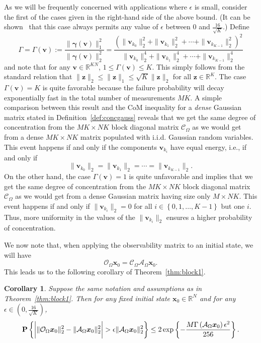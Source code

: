 \documentclass[11pt,draftcls,onecolumn]{IEEEtran}
\def\real    { \mathbb{R} }
\newtheorem{cor}{Corollary}
\newcommand{\eps}{\epsilon}
\newcommand{\norm}[1]{\| #1 \|}
\newcommand{\Prob}[1]{{\bf P}\left\{#1\right\}}
\def \ok {{\mathcal{O}_{\Omega}}}
\def \ck {{\mathcal{C}_{\Omega}}}
\def \ak {{\mathcal{A}_{\Omega}}}
\newcommand{\vc}[1]{\boldsymbol{#1}}
\def\real    { \mathbb{R} }
\begin{document}
As we will be frequently concerned with applications where
$\epsilon$ is small, consider the first of the cases given in the right-hand side of the above bound. (It can be shown~\cite{park2011block} that this case always permits any value of $\eps$ between $0$ and $\frac{16}{\sqrt{K}}$.) Define
\begin{equation}
 \Gamma =  \Gamma\left(\vc{v}\right)
:= \frac{\|\vc{\gamma}\left(\vc{v}\right)\|_1^2}{\norm{\vc{\gamma}\left(\vc{v}\right)}^2_2}
= \frac{\left( \|\vc{v}_{k_0}\|_2^2 + \|\vc{v}_{k_1}\|_2^2 + \cdots + \|\vc{v}_{k_{K-1}}\|_2^2\right)^2}{\|\vc{v}_{k_0}\|_2^4 + \|\vc{v}_{k_1}\|_2^4 + \cdots + \|\vc{v}_{k_{K-1}}\|_2^4}
\label{eq:Lambda}
\end{equation}
and note that for any $\vc{v} \in
\real^{KN}$, $ 1 \leq  \Gamma\left(\vc{v}\right) \leq K$. This simply follows from the standard relation that $\|\vc{z}\|_2 \leq \|\vc{z}\|_1 \leq \sqrt{K}\|\vc{z}\|_2$ for all $\vc{z} \in \real^K$.
The case $ \Gamma\left(\vc{v}\right) = K$ is quite favorable because the failure probability will decay exponentially fast in the total number of measurements $MK$.
A simple comparison between this result and the \ac{CoM} inequality for a
{\em dense} Gaussian matrix stated in Definition~\ref{def:concgauss} reveals that we get the same degree of concentration from the $MK \times NK$ block diagonal matrix $\ck$ as we would get from a dense $MK \times NK$ matrix populated with \ac{i.i.d.} Gaussian random variables. This event happens if and only if the components $\vc{v}_{k_i}$ have equal energy, i.e., if and only if
$$
\|\vc{v}_{k_0}\|_2 = \|\vc{v}_{k_1}\|_2 = \cdots = \|\vc{v}_{k_{K-1}}\|_2.
$$
On the other hand, the case  $ \Gamma\left(\vc{v}\right) = 1$ is quite unfavorable and implies that we get the same degree of concentration from the $MK \times NK$ block diagonal matrix $\ck$ as we would get from a dense Gaussian matrix having size only $M \times NK$. This event happens if and only if $\|\vc{v}_{k_i}\|_2 = 0$ for all $i \in \left\{0, 1, \dots, K-1\right\}$ but one $i$. Thus, more uniformity in the values of the $\|\vc{v}_{k_i}\|_2$ ensures a higher probability of concentration.


We now note that, when applying the observability matrix to an initial state, we will have
$$
\ok \vc{x}_0 = \ck \ak \vc{x}_0.
$$
This leads us to the following corollary of Theorem~\ref{thm:block1}.
\begin{cor} Suppose the same notation and assumptions as in Theorem~\ref{thm:block1}. Then for any fixed initial state $\vc{x}_0 \in \real^N$ and for any $\eps \in (0,\frac{16}{\sqrt{K}})$,
\begin{eqnarray}
\Prob{\bigg{|}\|\ok \vc{x}_0 \|_{2}^{2}-\|\ak \vc{x}_0\|_2^2\bigg{|} > \epsilon \|\ak \vc{x}_0\|_{2}^{2}}
\leq
2\exp\left\{-\frac{M \Gamma\left(\ak \vc{x}_0\right) \epsilon^{2}}{256}\right\}.
\label{eq:conc2}
\end{eqnarray}
\label{cor:obs_indep}
\end{cor}
\end{document}
